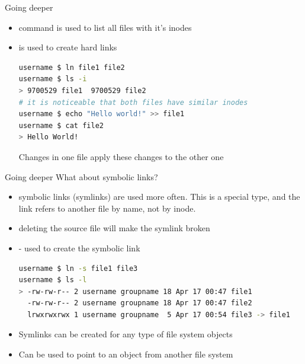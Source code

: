 \documentclass[usenames,dvipsnames,10pt,aspectratio=169]{beamer}
\begin{document}
\begin{frame}[fragile]{Going deeper}
    \begin{itemize}
        \item {} command is used to list all files with it's inodes
        \item {} is used to create hard links
        \begin{lstlisting}[language=Bash, style=shellstyle]
username $ ln file1 file2
username $ ls -i
> 9700529 file1  9700529 file2
# it is noticeable that both files have similar inodes
username $ echo "Hello world!" >> file1
username $ cat file2
> Hello World!\end{lstlisting}
        Changes in one file apply these changes to the other one \newline
    \end{itemize}
\end{frame}

\begin{frame}[fragile]{Going deeper}
    What about symbolic links?
    \begin{itemize}
        \item symbolic links (symlinks) are used more often. This is a special type, and the link refers to another file by name, not by inode.
        \item deleting the source file will make the symlink broken
        \item {} - used to create the symbolic link
        \begin{lstlisting}[language=Bash, style=shellstyle]
username $ ln -s file1 file3
username $ ls -l
> -rw-rw-r-- 2 username groupname 18 Apr 17 00:47 file1
  -rw-rw-r-- 2 username groupname 18 Apr 17 00:47 file2
  lrwxrwxrwx 1 username groupname  5 Apr 17 00:54 file3 -> file1 \end{lstlisting}

        \item Symlinks can be created for any type of file system objects
        \item Can be used to point to an object from another file system
    \end{itemize}
\end{frame}
\end{document}
